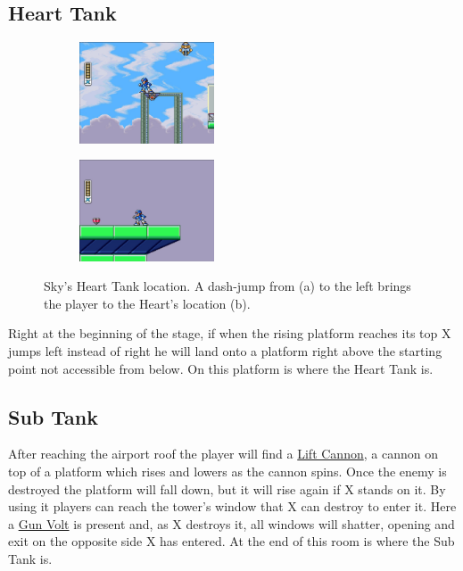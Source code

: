 \subsection{Heart Tank}
\begin{figure}[htp]
	\centering
	\begin{subfigure}{0.4\linewidth}
		\centering
		\includegraphics[height=3cm]{figures/X1/Storm_eagle/Storm_heart_1.jpg}
		\caption{}
	\end{subfigure}
	\begin{subfigure}{0.4\linewidth}
		\centering
		\includegraphics[height=3cm]{figures/X1/Storm_eagle/Storm_heart_2.jpg}
		\caption{}
	\end{subfigure}
	\caption{Sky's Heart Tank location. A dash-jump from (a) to the left brings the player to the Heart's location (b).}
\end{figure}
Right at the beginning of the stage, if when the rising platform reaches its top X jumps left instead of right he will land onto a platform right above the starting point not accessible from below. On this platform is where the Heart Tank is.


\subsection{Sub Tank}
After reaching the airport roof the player will find a 	\hyperlink{enem:Lift_Cannon}{Lift Cannon}, a cannon on top of a platform which rises and lowers as the cannon spins. Once the enemy is destroyed the platform will fall down, but it will rise again if X stands on it. By using it players can reach the tower's window that X can destroy to enter it. Here a \hyperlink{enem:Gun_Volt}{Gun Volt} is present and, as X destroys it, all windows will shatter, opening and exit on the opposite side X has entered. At the end of this room is where the Sub Tank is. 

